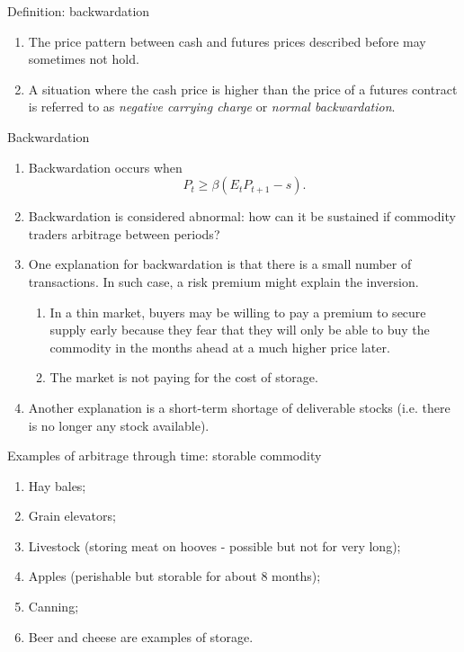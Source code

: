 \documentclass[table,xcolor=pdftex,dvipsnames, handout]{beamer}\usepackage[]{graphicx}\usepackage[]{color}
\begin{document}

\begin{frame}{Definition: backwardation}
\begin{enumerate}[label=\textbullet]
    \item The price pattern between cash and futures prices described before may sometimes not hold.
    \item A situation where the cash price is higher than the price of a futures contract is referred to as \emph{negative carrying charge} or \emph{normal backwardation}.
\end{enumerate}
\end{frame}


\begin{frame}{Backwardation}
\begin{enumerate}[label=\textbullet]
    \item Backwardation occurs when  \[ P_t \ge \beta (E_t P_{t+1} - s). \]
            \vspace{-1\baselineskip}
    \item Backwardation is considered abnormal: how can it be sustained if commodity traders arbitrage between periods?
    \item One explanation for backwardation is that there is a small number of transactions. In such case, a risk premium might explain the inversion.%
        \begin{enumerate}[label=-]
          \item In a thin market, buyers may be willing to pay a premium to secure supply early because they fear that they will only be able to buy the commodity in the months ahead at a much higher price later.
          \item The market is not paying for the cost of storage.
        \end{enumerate}
    \item Another explanation is a short-term shortage of deliverable stocks (i.e. there is no longer any stock available).
\end{enumerate}
\end{frame}



\begin{frame}{Examples of arbitrage through time: storable commodity}
\begin{enumerate}[label=\textbullet]
    \item Hay bales;
    \item Grain elevators;
    \item Livestock (storing meat on hooves - possible but not for very long);
    \item Apples (perishable but storable for about 8 months);
    \item Canning;
    \item Beer and cheese are examples of storage.
\end{enumerate}
\end{frame}
\end{document}
